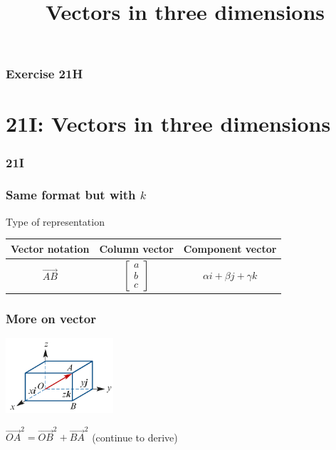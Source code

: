\documentclass[
	11pt, %
]{beamer}
\begin{document}
\begin{frame}
    \frametitle{Exercise 21H}
\end{frame}


\section{21I: Vectors in three dimensions}
\begin{frame}
    \frametitle{21I}
    \begin{center}
        \title{Vectors in three dimensions}
        \maketitle
    \end{center}
\end{frame}

\begin{frame}
    \frametitle{Same format but with $k$}
    \begin{block}{Type of representation}
        \centering
        \begin{tabular}{|c|c|c|}
            Vector notation & Column vector & Component vector\\
            \hline
            $\vec{AB}$ & $\begin{bmatrix}
                a\\
                b\\
                c
            \end{bmatrix} $ & $\alpha i + \beta j + \gamma k$
        \end{tabular}
    \end{block}
\end{frame}

\begin{frame}[t]
    \frametitle{More on vector}
    \begin{center}
        \includegraphics[width = 4cm]{3d.png}
    \end{center}
    $\vec{OA}^2 = \vec{OB}^2 + \vec{BA}^2$ (continue to derive)
\end{frame}
\end{document}
